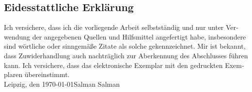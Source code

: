 \newpage
\begin{otherlanguage}{ngerman}
\thispagestyle{empty}
\section*{Eidesstattliche Erklärung}
\thispagestyle{empty}
Ich versichere, dass ich die vorliegende Arbeit selbstständig und nur unter Verwendung der
angegebenen Quellen und Hilfsmittel angefertigt habe, insbesondere sind wörtliche oder
sinngemäße Zitate als solche gekennzeichnet. Mir ist bekannt, dass Zuwiderhandlung auch
nachträglich zur Aberkennung des Abschlusses führen kann.
Ich versichere, dass das elektronische Exemplar mit den gedruckten Exemplaren übereinstimmt.
\newline
\vspace{4\baselineskip}\\
Leipzig, den \today \hfill Salman Salman 
\vspace{4\baselineskip}\\
\end{otherlanguage}